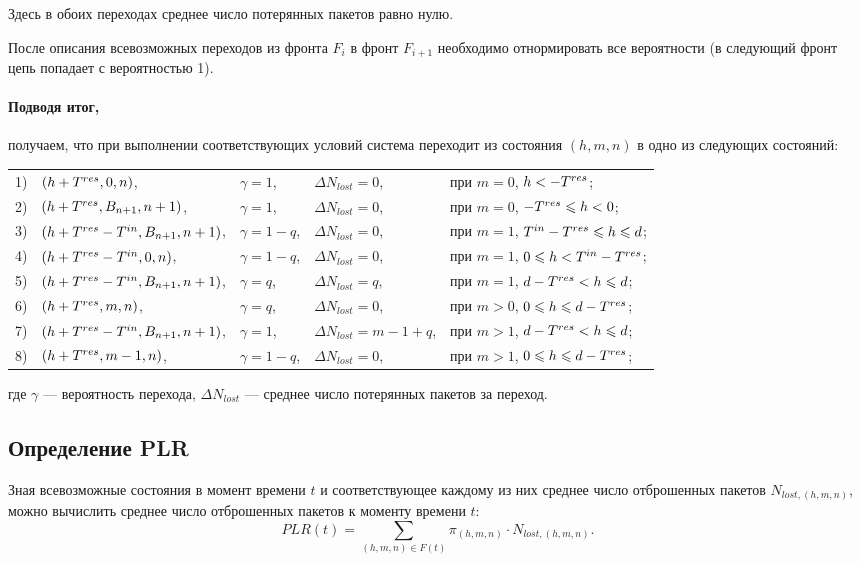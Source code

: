 Здесь в обоих переходах среднее число потерянных пакетов равно нулю.

После описания всевозможных переходов из фронта $F_i$ в фронт $F_{i+1}$ необходимо отнормировать все вероятности (в следующий фронт цепь попадает с вероятностью 1).

\paragraph{Подводя итог,} получаем, что при выполнении соответствующих условий система  переходит из состояния $(h, m, n)$ в одно из следующих состояний:

\begin{tabular}{l l l l l}
1)	&$(h + T^{res}, 0, n)$, 			&$\gamma = 1$, &$\Delta N_{lost} = 0$,	&при $m = 0$, $h < -T^{res}$; \\
2)  &$(h + T^{res}, B_{n+1}, n+1)$, 			&$\gamma = 1$, &$\Delta N_{lost} = 0$, &при $m = 0$, $-T^{res} \leqslant h < 0$; \\
3)  &$(h + T^{res} - T^{in}, B_{n+1}, n+1)$, 	&$\gamma = 1 - q$,  &$\Delta N_{lost} = 0$, &при $m = 1$, $T^{in} - T^{res} \leqslant h \leqslant d$; \\
4)  &$(h + T^{res} - T^{in}, 0, n)$, 	&$\gamma = 1 - q$,  &$\Delta N_{lost} = 0$, &при $m = 1$, $0 \leqslant h < T^{in} - T^{res}$; \\
5)  &$(h + T^{res} - T^{in}, B_{n+1}, n + 1)$, 	&$\gamma = q$,  &$\Delta N_{lost} = q$, &при $m = 1$, $d - T^{res} < h \leqslant d$; \\
6)  &$(h + T^{res}, m, n)$, 			&$\gamma = q$,  &$\Delta N_{lost} = 0$, &при $m > 0$, $0 \leqslant h \leqslant d - T^{res}$; \\
7)  &$(h + T^{res} - T^{in}, B_{n+1}, n+1)$,	&$\gamma = 1$,  &$\Delta N_{lost} = m - 1 + q$, &при $m > 1$, $d - T^{res} < h \leqslant d$; \\
8)  &$(h + T^{res}, m - 1, n)$, &$\gamma = 1 - q$,  &$\Delta N_{lost} = 0$, &при $m > 1$, $0 \leqslant h \leqslant d - T^{res}$;
\end{tabular} \newline
где $\gamma$ --- вероятность перехода,  $\Delta N_{lost}$ --- среднее число потерянных пакетов за переход.

\subsection{Определение PLR}
Зная всевозможные состояния в момент времени $t$ и соответствующее каждому из них среднее число отброшенных пакетов $N_{lost, (h, m, n)}$, можно вычислить среднее число отброшенных пакетов к моменту времени $t$:
$$
PLR(t) = \sum\limits_{(h,m,n) \in F(t)} \pi_{(h,m,n)} \cdot N_{lost, (h, m, n)}.
$$

